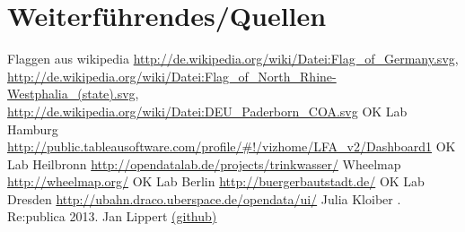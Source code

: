 \section{Weiterführendes/Quellen}
\begin{thebibliography}{10}
   Flaggen aus wikipedia
   \newblock {}
   \newblock \url{http://de.wikipedia.org/wiki/Datei:Flag_of_Germany.svg}, \url{http://de.wikipedia.org/wiki/Datei:Flag_of_North_Rhine-Westphalia_(state).svg}, \url{http://de.wikipedia.org/wiki/Datei:DEU_Paderborn_COA.svg}
   OK Lab Hamburg
   \newblock \url{http://public.tableausoftware.com/profile/\#!/vizhome/LFA_v2/Dashboard1} 
   OK Lab Heilbronn
   \newblock \url{http://opendatalab.de/projects/trinkwasser/}
   Wheelmap
   \newblock \url{http://wheelmap.org/}
  \newpage
   OK Lab Berlin
   \newblock \url{http://buergerbautstadt.de/}  
   OK Lab Dresden
   \newblock \url{http://ubahn.draco.uberspace.de/opendata/ui/}
   Julia Kloiber
   .
   \newblock Re:publica 2013.
   Jan Lippert
    \href{https://github.com/ironjan/open-data-smalltalk}{(github)}

\end{thebibliography}